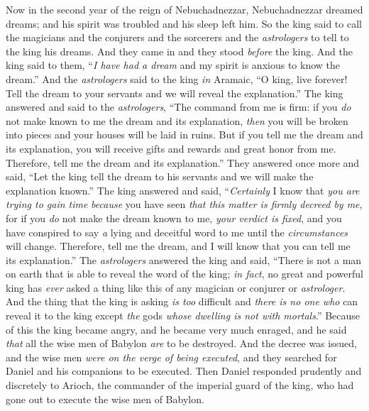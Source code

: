 \begin{biblechapter} %
 Now in the second year of the reign of Nebuchadnezzar, Nebuchadnezzar dreamed dreams; and his spirit was troubled and his sleep left him.
\verse So the king said to call the magicians and the conjurers and the sorcerers and the \textit{astrologers} to tell to the king his dreams. And they came in and they stood \textit{before} the king.
\verse And the king said to them, “\textit{I have had a dream} and my spirit is anxious to know the dream.”
\verse And the \textit{astrologers} said to the king \textit{in} Aramaic, “O king, live forever! Tell the dream to your servants and we will reveal the explanation.”
\verse The king answered and said to the \textit{astrologers}, “The command from me is firm: if you \textit{do} not make known to me the dream and its explanation, \textit{then} you will be broken into pieces and your houses will be laid in ruins.
\verse But if you tell me the dream and its explanation, you will receive gifts and rewards and great honor from me. Therefore, tell me the dream and its explanation.”
\verse They answered once more and said, “Let the king tell the dream to his servants and we will make the explanation known.”
\verse The king answered and said, “\textit{Certainly} I know that \textit{you are trying to gain time} \textit{because} you have seen \textit{that this matter is firmly decreed by me},
\verse for if you \textit{do} not make the dream known to me, \textit{your verdict is fixed}, and you have conspired to say \textit{a} lying and deceitful word to me until the \textit{circumstances} will change. Therefore, tell me the dream, and I will know that you can tell me its explanation.”
\verse The \textit{astrologers} answered the king and said, “There is not a man on earth that is able to reveal the word of the king; \textit{in fact}, no great and powerful king has \textit{ever} asked a thing like this of any magician or conjurer or \textit{astrologer}.
\verse And the thing that the king is asking \textit{is too} difficult and \textit{there is no one who} can reveal it to the king except \textit{the} gods \textit{whose dwelling is not with mortals}.”
\verse Because of this the king became angry, and he became very much enraged, and he said \textit{that} all the wise men of Babylon \textit{are} to be destroyed.
\verse And the decree was issued, and the wise men \textit{were on the verge of being executed}, and they searched for Daniel and his companions to be executed.
\verse Then Daniel responded prudently and discretely to Arioch, the commander of the imperial guard of the king, who had gone out to execute the wise men of Babylon.

\end{biblechapter}
